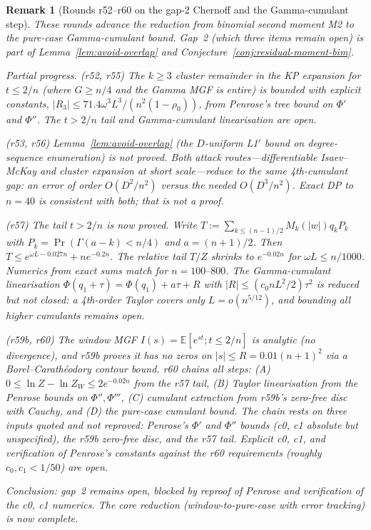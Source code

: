 \documentclass[11pt]{article}
\newtheorem{remark}[theorem]{Remark}
\newcommand{\EE}{\mathbb{E}}
\begin{document}
\begin{remark}[Rounds r52--r60 on the gap-2 Chernoff and the Gamma-cumulant step]
\label{rem:rounds-r52-r60}
These rounds advance the reduction from binomial second moment M2 to the pure-case
Gamma-cumulant bound. Gap~2 (which three items remain open) is part of Lemma~\ref{lem:avoid-overlap}
and Conjecture~\ref{conj:residual-moment-bim}.

\emph{Partial progress.}
(r52, r55) The \(k\ge3\) cluster remainder in the KP expansion for \(t\le2/n\)
(where \(G\ge n/4\) and the Gamma MGF is entire) is bounded with explicit constants,
\(|R_3|\le71.4\omega^3L^3/(n^2(1-\rho_0))\), from Penrose's tree bound on
\(\Phi'\) and \(\Phi''\). The \(t>2/n\) tail and Gamma-cumulant linearisation are open.

(r53, r56) Lemma~\ref{lem:avoid-overlap} (the \(D\)-uniform L1$'$ bound on degree-sequence
enumeration) is not proved. Both attack routes---differentiable Isaev--McKay and cluster
expansion at short scale---reduce to the same 4th-cumulant gap: an error of order
\(O(D^2/n^2)\) versus the needed \(O(D^3/n^2)\). Exact DP to \(n=40\) is consistent with
both; that is not a proof.

(r57) The tail \(t>2/n\) is now proved. Write $T:=\sum_{k\le(n-1)/2}M_k(|w|)q_kP_k$
with $P_k=\Pr(\Gamma(a-k)<n/4)$ and $a=(n+1)/2$. Then $T\le e^{\omega L-0.027n}+n e^{-0.2n}$.
The relative tail $T/Z$ shrinks to $e^{-0.02n}$ for $\omega L\le n/1000$. Numerics
from exact sums match for $n=100\text{--}800$. The Gamma-cumulant linearisation
$\Phi(q_1+\tau)=\Phi(q_1)+a\tau+R$ with $|R|\le(c_0nL^2/2)\tau^2$ is reduced
but not closed: a 4th-order Taylor covers only $L=o(n^{5/12})$, and bounding
all higher cumulants remains open.

(r59b, r60) The window MGF $I(s)=\EE[e^{st};t\le2/n]$ is analytic (no divergence),
and r59b proves it has no zeros on $|s|\le R=0.01(n+1)^2$ via a Borel--Carathéodory
contour bound. r60 chains all steps: (A) $0\le\ln Z-\ln Z_W\le 2e^{-0.02n}$ from the r57
tail, (B) Taylor linearisation from the Penrose bounds on $\Phi'',\Phi'''$, (C) cumulant
extraction from r59b's zero-free disc with Cauchy, and (D) the pure-case cumulant bound.
The chain rests on three inputs quoted and not reproved: Penrose's $\Phi'$ and $\Phi''$
bounds (c0, c1 absolute but unspecified), the r59b zero-free disc, and the r57 tail.
Explicit c0, c1, and verification of Penrose's constants against the r60 requirements
(roughly $c_0, c_1<1/50$) are open.

\emph{Conclusion:} gap~2 remains open, blocked by reproof of Penrose and verification
of the c0, c1 numerics. The core reduction (window-to-pure-case with error tracking)
is now complete.
\end{remark}
\end{document}
